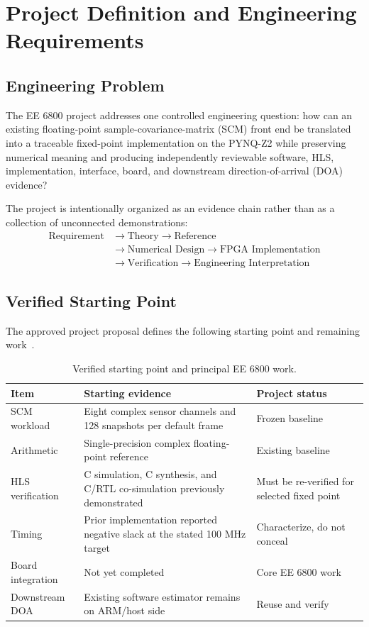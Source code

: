 ﻿\chapter{Project Definition and Engineering Requirements}
\label{ch:project-definition}

\section{Engineering Problem}
The EE 6800 project addresses one controlled engineering question: how can an existing
floating-point sample-covariance-matrix (SCM) front end be translated into a traceable
fixed-point implementation on the PYNQ-Z2 while preserving numerical meaning and
producing independently reviewable software, HLS, implementation, interface, board, and
downstream direction-of-arrival (DOA) evidence?

The project is intentionally organized as an evidence chain rather than as a collection of
unconnected demonstrations:
\begin{equation}
\boxed{
\begin{aligned}
\text{Requirement} &\rightarrow \text{Theory} \rightarrow \text{Reference} \\
&\rightarrow \text{Numerical Design} \rightarrow \text{FPGA Implementation} \\
&\rightarrow \text{Verification} \rightarrow \text{Engineering Interpretation}
\end{aligned}}
\end{equation}

\section{Verified Starting Point}
The approved project proposal defines the following starting point and remaining work~\cite{molhem2026ee6800proposal}.
\begin{table}[H]
\centering
\caption{Verified starting point and principal EE 6800 work.}
\begin{tabularx}{\textwidth}{@{}p{}X p{}@{}}
\toprule
\textbf{Item} & \textbf{Starting evidence} & \textbf{Project status}\\
\midrule
SCM workload & Eight complex sensor channels and 128 snapshots per default frame & Frozen baseline\\
Arithmetic & Single-precision complex floating-point reference & Existing baseline\\
HLS verification & C simulation, C synthesis, and C/RTL co-simulation previously demonstrated & Must be re-verified for selected fixed point\\
Timing & Prior implementation reported negative slack at the stated 100 MHz target & Characterize, do not conceal\\
Board integration & Not yet completed & Core EE 6800 work\\
Downstream DOA & Existing software estimator remains on ARM/host side & Reuse and verify\\
\bottomrule
\end{tabularx}
\end{table}

